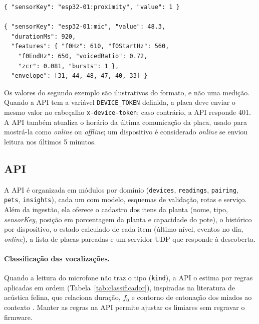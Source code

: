 \begin{lstlisting}
{ "sensorKey": "esp32-01:proximity", "value": 1 }

{ "sensorKey": "esp32-01:mic", "value": 48.3,
  "durationMs": 920,
  "features": { "f0Hz": 610, "f0StartHz": 560,
    "f0EndHz": 650, "voicedRatio": 0.72,
    "zcr": 0.081, "bursts": 1 },
  "envelope": [31, 44, 48, 47, 40, 33] }
\end{lstlisting}

Os valores do segundo exemplo são ilustrativos do formato, e não uma medição. Quando a API tem a variável \texttt{DEVICE\_TOKEN} definida, a placa deve enviar o mesmo valor no cabeçalho \texttt{x-device-token}; caso contrário, a API responde 401. A API também atualiza o horário da última comunicação da placa, usado para mostrá-la como \textit{online} ou \textit{offline}; um dispositivo é considerado \textit{online} se enviou leitura nos últimos 5 minutos.

\subsection{API}

A API é organizada em módulos por domínio (\texttt{devices}, \texttt{readings}, \texttt{pairing}, \texttt{pets}, \texttt{insights}), cada um com modelo, esquemas de validação, rotas e serviço. Além da ingestão, ela oferece o cadastro dos itens da planta (nome, tipo, \textit{sensorKey}, posição em porcentagem da planta e capacidade do pote), o histórico por dispositivo, o estado calculado de cada item (último nível, eventos no dia, \textit{online}), a lista de placas pareadas e um servidor UDP que responde à descoberta.

\paragraph{Classificação das vocalizações.}
Quando a leitura do microfone não traz o tipo (\texttt{kind}), a API o estima por regras aplicadas em ordem (Tabela~\ref{tab:classificador}), inspiradas na literatura de acústica felina, que relaciona duração, $f_0$ e contorno de entonação dos miados ao contexto \citep{schotz2019}. Manter as regras na API permite ajustar os limiares sem regravar o firmware. 

